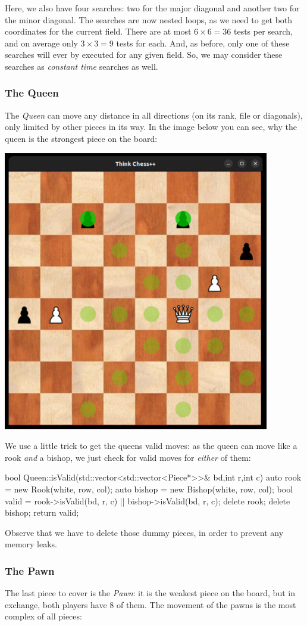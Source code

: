 Here, we also have four searches: two for the major diagonal and another two for the minor
diagonal.
The searches are now nested loops, as we need to get both coordinates for the current field.
There are at most $6 \times 6 = 36$ tests per search, and on average only $3 \times 3 = 9$
tests for each.
And, as before, only one of these searches will ever by executed for any given field.
So, we may consider these searches as \emph{constant time} searches as well.

\subsubsection{The Queen}
The \emph{Queen} can move any distance in all directions (on its rank, file or diagonals),
only limited by other pieces in its way.
In the image below you can see, why the queen is the strongest piece on the board:

\begin{center}
\includegraphics[width=.5\linewidth]{../img/queen.jpg}
\end{center}

We use a little trick to get the queens valid moves: as the queen can move like a rook
\emph{and} a bishop, we just check for valid moves for \emph{either} of them:

\begin{cpp}
bool Queen::isValid(std::vector<std::vector<Piece*>>& bd,int r,int c) {
  auto rook = new Rook(white, row, col);
  auto bishop = new Bishop(white, row, col);
  bool valid = rook->isValid(bd, r, c) || bishop->isValid(bd, r, c);
  delete rook;
  delete bishop;
  return valid;
}
\end{cpp}

Observe that we have to delete those dummy pieces, in order to prevent any memory leaks.

\subsubsection{The Pawn}
The last piece to cover is the \emph{Pawn}: it is the weakest piece on the board, but in
exchange, both players have 8 of them.
The movement of the pawns is the most complex of all pieces:

